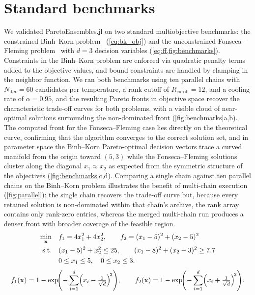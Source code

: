 \documentclass[12pt]{article}
\begin{document}
\clearpage
\section{Standard benchmarks}\label{sec:si_benchmarks}
We validated ParetoEnsembles.jl on two standard multiobjective benchmarks: the constrained Binh--Korn problem~\cite{Binh1997} (\cref{eq:bk_obj}) and the unconstrained Fonseca--Fleming problem~\cite{Fonseca1995} with $d = 3$ decision variables (\cref{eq:ff,fig:benchmarks}).
Constraints in the Binh--Korn problem are enforced via quadratic penalty terms added to the objective values, and bound constraints are handled by clamping in the neighbor function.
We ran both benchmarks using ten parallel chains with $N_{\text{iter}} = 60$ candidates per temperature, a rank cutoff of $R_{\text{cutoff}} = 12$, and a cooling rate of $\alpha = 0.95$, and the resulting Pareto fronts in objective space recover the characteristic trade-off curves for both problems, with a visible cloud of near-optimal solutions surrounding the non-dominated front (\cref{fig:benchmarks}a,b).
The computed front for the Fonseca--Fleming case lies directly on the theoretical curve, confirming that the algorithm converges to the correct solution set, and in parameter space the Binh--Korn Pareto-optimal decision vectors trace a curved manifold from the origin toward $(5, 3)$ while the Fonseca--Fleming solutions cluster along the diagonal $x_1 \approx x_2$ as expected from the symmetric structure of the objectives (\cref{fig:benchmarks}c,d).
Comparing a single chain against ten parallel chains on the Binh--Korn problem illustrates the benefit of multi-chain execution (\cref{fig:parallel}): the single chain recovers the trade-off curve but, because every retained solution is non-dominated within that chain's archive, the rank array contains only rank-zero entries, whereas the merged multi-chain run produces a denser front with broader coverage of the feasible region.
\begin{align}
  \min_{\mathbf{x}} \quad & f_1 = 4x_1^2 + 4x_2^2, \qquad f_2 = (x_1 - 5)^2 + (x_2 - 5)^2 \label{eq:bk_obj} \\
  \text{s.t.} \quad & (x_1 - 5)^2 + x_2^2 \leq 25, \qquad (x_1 - 8)^2 + (x_2 - 3)^2 \geq 7.7 \notag \\
  & 0 \leq x_1 \leq 5, \quad 0 \leq x_2 \leq 3. \notag
\end{align}
\begin{equation}\label{eq:ff}
  f_1(\mathbf{x}) = 1 - \exp\!\Biggl(-\sum_{i=1}^{d}\Bigl(x_i - \tfrac{1}{\sqrt{d}}\Bigr)^{\!2}\Biggr), \qquad
  f_2(\mathbf{x}) = 1 - \exp\!\Biggl(-\sum_{i=1}^{d}\Bigl(x_i + \tfrac{1}{\sqrt{d}}\Bigr)^{\!2}\Biggr).
\end{equation}
\end{document}
